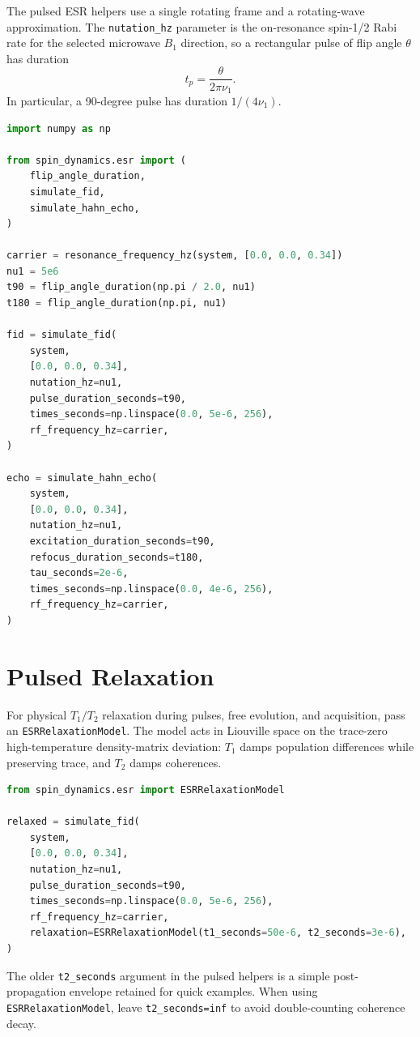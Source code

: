 \documentclass[11pt,oneside]{report}
\newcommand{\code}[1]{\texttt{#1}}
\begin{document}
The pulsed ESR helpers use a single rotating frame and a rotating-wave
approximation. The \code{nutation\_hz} parameter is the on-resonance spin-1/2
Rabi rate for the selected microwave \(B_1\) direction, so a rectangular pulse
of flip angle \(\theta\) has duration
\[
  t_p = \frac{\theta}{2\pi \nu_1}.
\]
In particular, a 90-degree pulse has duration \(1/(4\nu_1)\).

\begin{lstlisting}[language=Python]
import numpy as np

from spin_dynamics.esr import (
    flip_angle_duration,
    simulate_fid,
    simulate_hahn_echo,
)

carrier = resonance_frequency_hz(system, [0.0, 0.0, 0.34])
nu1 = 5e6
t90 = flip_angle_duration(np.pi / 2.0, nu1)
t180 = flip_angle_duration(np.pi, nu1)

fid = simulate_fid(
    system,
    [0.0, 0.0, 0.34],
    nutation_hz=nu1,
    pulse_duration_seconds=t90,
    times_seconds=np.linspace(0.0, 5e-6, 256),
    rf_frequency_hz=carrier,
)

echo = simulate_hahn_echo(
    system,
    [0.0, 0.0, 0.34],
    nutation_hz=nu1,
    excitation_duration_seconds=t90,
    refocus_duration_seconds=t180,
    tau_seconds=2e-6,
    times_seconds=np.linspace(0.0, 4e-6, 256),
    rf_frequency_hz=carrier,
)
\end{lstlisting}

\section{Pulsed Relaxation}

For physical \(T_1/T_2\) relaxation during pulses, free evolution, and
acquisition, pass an \code{ESRRelaxationModel}. The model acts in
Liouville space on the trace-zero high-temperature density-matrix deviation:
\(T_1\) damps population differences while preserving trace, and \(T_2\) damps
coherences.

\begin{lstlisting}[language=Python]
from spin_dynamics.esr import ESRRelaxationModel

relaxed = simulate_fid(
    system,
    [0.0, 0.0, 0.34],
    nutation_hz=nu1,
    pulse_duration_seconds=t90,
    times_seconds=np.linspace(0.0, 5e-6, 256),
    rf_frequency_hz=carrier,
    relaxation=ESRRelaxationModel(t1_seconds=50e-6, t2_seconds=3e-6),
)
\end{lstlisting}

The older \code{t2\_seconds} argument in the pulsed helpers is a simple
post-propagation envelope retained for quick examples. When using
\code{ESRRelaxationModel}, leave \code{t2\_seconds=inf} to avoid double-counting
coherence decay.
\end{document}

